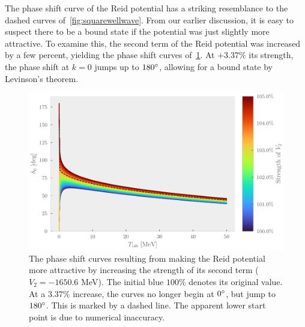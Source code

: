 The phase shift curve of the Reid potential has a striking resemblance to the
dashed curves of~\cref{fig:squarewellwave}. From our earlier discussion, it is
easy to suspect
there to be a bound state if the potential was just slightly more
attractive. To examine this, the second term of the Reid potential was increased
by a few percent, yielding the phase shift curves of~\cref{fig:changeV2}. At
\(+3.37\%\) its strength, the phase shift at \(k=0\) jumps up to \(180\degree\),
allowing for a bound state by Levinson's theorem.

\begin{figure}[ht!]
  \centering
  \includegraphics[]{Figures/change_in_V2.pdf}
  \caption{\label{fig:changeV2}The phase shift curves resulting from making the
  Reid potential more attractive by increasing the strength of its second term
  (\(V_{2}=-1650.6\) MeV). The initial blue \(100\%\) denotes its original
  value. At a \(3.37\%\) increase, the curves no longer begin at \(0\degree\),
  but jump to \(180\degree\). This is marked by a dashed line. The apparent lower start point is due to numerical
inaccuracy.}
\end{figure}



